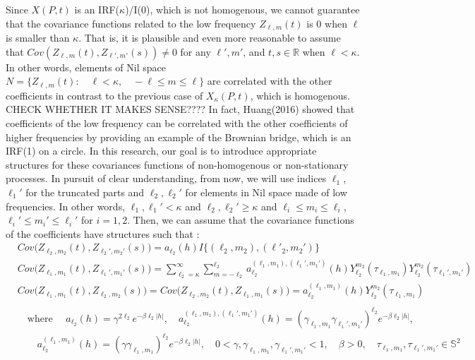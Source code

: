 \documentclass[11pt]{article}
\begin{document}
\begin{itemize}
{\begin{align*}
\end{align*}
}
\\
Since $X(P,t)$ is an IRF($\kappa$)/I(0), which is not homogenous, we cannot guarantee that the covariance functions related to the low frequency $Z_{\ell, m}(t)$ is 0 when $\ell$ is smaller than $\kappa$. That is, it is plausible and even more reasonable to assume that $Cov(Z_{\ell,m}(t), Z_{\ell',m'}(s)) \ne 0$ for any $\ell', m'$, and $t,s \in \mathbb{R}$ when $\ell<\kappa$. In other words, elements of Nil space $N=\{Z_{\ell,m}(t) : \quad \ell<\kappa, \quad -\ell \le m \le \ell\}$ are correlated with the other coefficients in contrast to the previous case of $X_\kappa(P,t)$, which is homogenous.{\color{red} CHECK WHETHER IT MAKES SENSE????} In fact, Huang(2016) showed that coefficients of the low frequency can be correlated with the other coefficients of higher frequencies by providing an example of the Brownian bridge, which is an IRF(1) on a circle. In this research, our goal is to introduce appropriate structures for these covariances functions of non-homogenous or non-stationary processes. In pursuit of clear understanding, from now, we will use indices $\ell_1$, $\ell_1'$ for the truncated parts and $\ell_2,\ell_2'$ for elements in Nil space made of low frequencies. In other words, $\ell_1, \ell_1' < \kappa$ and $\ell_2, \ell _2' \ge \kappa$ and $\ell_i \le m_i \le \ell_i$, $\ell_i' \le m_i' \le \ell_i'$ for $i=1,2$. Then, we can assume that the covariance functions of the coefficients have structures such that :\\
\begin{align*}
&Cov\biggl( Z_{\ell_2,m_2}(t), Z_{\ell_2',m_2'}(s) \biggl) = a_{\ell_2}(h) I\{(\ell_2,m_2),(\ell'_2,m_2')\}\\
&Cov\biggl( Z_{\ell_1,m_1}(t), Z_{\ell_1',m_1'}(s) \biggl) = \sum_{\ell_2=\kappa}^{\infty} \sum_{m=-\ell_2}^{\ell_2} a_{\ell_2}^{(\ell_1,m_1), (\ell_1',m_1')} (h) Y_{\ell_2}^{m_2}(\tau_{\ell_1,m_1}) Y_{\ell_2}^{m_2}(\tau_{\ell_1',m_1'})\\
&Cov\biggl( Z_{\ell_1,m_1}(t), Z_{\ell_2,m_2}(s) \biggl) = Cov\biggl( Z_{\ell_2,m_2}(t), Z_{\ell_1,m_1}(s) \biggl) = a_{\ell_2}^{(\ell_1, m_1)}(h) Y_{\ell_2}^{m_2}(\tau_{\ell_1,m_1})\\
\\
&\quad \text{where } \quad a_{\ell_2}(h) = \gamma^{2 \ell_2} e^{-\beta \ell_2|h|}, \quad  a_{\ell_2}^{(\ell_1,m_1), (\ell_1',m_1')}(h) = (\gamma_{\ell_1,m_1} \gamma_{\ell_1',m_1'})^{\ell_2} e^{-\beta \ell_2|h|},\\
&\quad \quad a_{\ell_2}^{(\ell_1, m_1)}(h) = (\gamma \gamma_{\ell_1,m_1})^{\ell_2} e^{-\beta \ell_2|h|}, \quad 0<\gamma, \gamma_{\ell_1,m_1}, \gamma_{\ell_1',m_1'} < 1, \quad \beta >0, \quad \tau_{\ell_1,m_1},  \tau_{\ell_1',m_1'} \in \mathbb{S}^2 \\

\end{align*}
\end{itemize}
\end{document}
